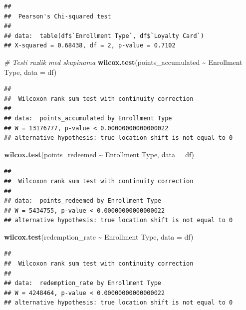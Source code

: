 \documentclass[
]{article}
\newenvironment{Shaded}{\begin{snugshade}}{\end{snugshade}}
\newcommand{\AttributeTok}[1]{\textcolor[rgb]{0.13,0.29,0.53}{#1}}
\newcommand{\CommentTok}[1]{\textcolor[rgb]{0.56,0.35,0.01}{\textit{#1}}}
\newcommand{\FunctionTok}[1]{\textcolor[rgb]{0.13,0.29,0.53}{\textbf{#1}}}
\newcommand{\NormalTok}[1]{#1}
\newcommand{\SpecialCharTok}[1]{\textcolor[rgb]{0.81,0.36,0.00}{\textbf{#1}}}
\newcommand{\StringTok}[1]{\textcolor[rgb]{0.31,0.60,0.02}{#1}}
\begin{document}
\begin{verbatim}
## 
##  Pearson's Chi-squared test
## 
## data:  table(df$`Enrollment Type`, df$`Loyalty Card`)
## X-squared = 0.68438, df = 2, p-value = 0.7102
\end{verbatim}

\begin{Shaded}
\begin{Highlighting}[]
\CommentTok{\# Testi razlik med skupinama}
\FunctionTok{wilcox.test}\NormalTok{(points\_accumulated }\SpecialCharTok{\textasciitilde{}} \StringTok{\textasciigrave{}}\AttributeTok{Enrollment Type}\StringTok{\textasciigrave{}}\NormalTok{, }\AttributeTok{data =}\NormalTok{ df)}
\end{Highlighting}
\end{Shaded}

\begin{verbatim}
## 
##  Wilcoxon rank sum test with continuity correction
## 
## data:  points_accumulated by Enrollment Type
## W = 13176777, p-value < 0.00000000000000022
## alternative hypothesis: true location shift is not equal to 0
\end{verbatim}

\begin{Shaded}
\begin{Highlighting}[]
\FunctionTok{wilcox.test}\NormalTok{(points\_redeemed }\SpecialCharTok{\textasciitilde{}} \StringTok{\textasciigrave{}}\AttributeTok{Enrollment Type}\StringTok{\textasciigrave{}}\NormalTok{, }\AttributeTok{data =}\NormalTok{ df)}
\end{Highlighting}
\end{Shaded}

\begin{verbatim}
## 
##  Wilcoxon rank sum test with continuity correction
## 
## data:  points_redeemed by Enrollment Type
## W = 5434755, p-value < 0.00000000000000022
## alternative hypothesis: true location shift is not equal to 0
\end{verbatim}

\begin{Shaded}
\begin{Highlighting}[]
\FunctionTok{wilcox.test}\NormalTok{(redemption\_rate }\SpecialCharTok{\textasciitilde{}} \StringTok{\textasciigrave{}}\AttributeTok{Enrollment Type}\StringTok{\textasciigrave{}}\NormalTok{, }\AttributeTok{data =}\NormalTok{ df)}
\end{Highlighting}
\end{Shaded}

\begin{verbatim}
## 
##  Wilcoxon rank sum test with continuity correction
## 
## data:  redemption_rate by Enrollment Type
## W = 4248464, p-value < 0.00000000000000022
## alternative hypothesis: true location shift is not equal to 0
\end{verbatim}
\end{document}

